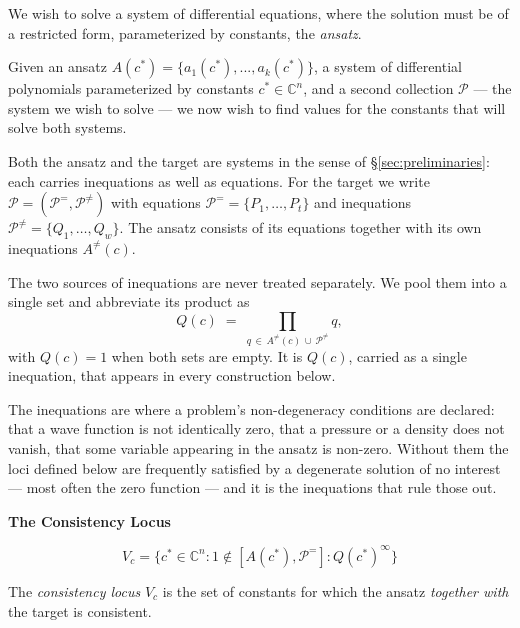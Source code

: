 \documentclass{article}
\theoremstyle{definition}
\theoremstyle{plain}
\begin{document}
We wish to solve a system of differential equations, where the solution must be of a restricted form, parameterized by constants,
the {\it ansatz}.

Given an ansatz $A(c^*) = \{ a_1(c^*),...,a_k(c^*) \}$, a system of differential polynomials parameterized by constants $c^* \in \mathbb{C}^n$,
and a second collection $\mathcal{P}$ --- the system we wish to solve ---
we now wish to find values for the constants that will solve both systems.

Both the ansatz and the target are systems in the sense of
\S\ref{sec:preliminaries}: each carries inequations as well as equations.  For
the target we write $\mathcal{P} = (\mathcal{P}^=, \mathcal{P}^{\ne})$ with
equations $\mathcal{P}^= = \{P_1, \ldots, P_t\}$ and inequations
$\mathcal{P}^{\ne} = \{Q_1, \ldots, Q_w\}$.  The ansatz consists of its
equations together with its own
inequations $A^{\ne}(c)$.

The two sources of inequations are never treated separately.  We pool them into
a single set and abbreviate its product as
%
\begin{equation}
\label{eq:Q-def}
Q(c) \;=\; \prod_{q \,\in\, A^{\ne}(c) \,\cup\, \mathcal{P}^{\ne}} q ,
\end{equation}
%
with $Q(c) = 1$ when both sets are empty.  It is $Q(c)$, carried as a single
inequation, that appears in every construction below.

The inequations are where a problem's non-degeneracy conditions are declared:
that a wave function is not identically zero, that a pressure or a density does
not vanish, that some variable appearing in the ansatz is non-zero.  Without
them the loci defined below are frequently satisfied by a degenerate solution of
no interest --- most often the zero function --- and it is the inequations that
rule those out.


{\bf The Consistency Locus}

\begin{equation}
V_c = \{ c^* \in {\mathbb C}^n : 1 \notin [A(c^*), \mathcal{P}^=] : Q(c^*)^\infty \}
\end{equation}

The {\it consistency locus} $V_c$ is the set of constants for which the ansatz
{\it together with} the target is consistent.

\end{document}
